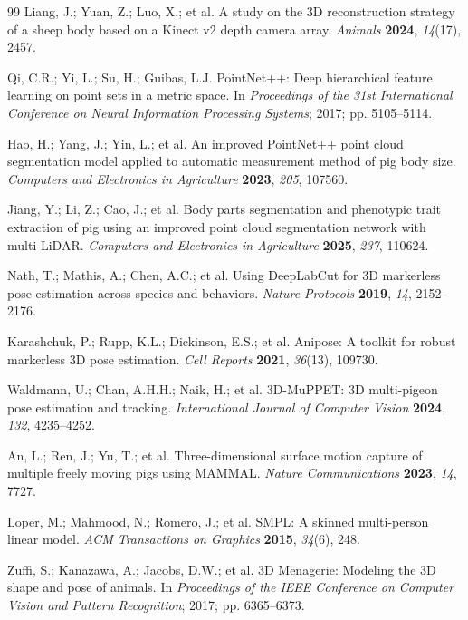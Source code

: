 \documentclass[computers,article,submit,pdftex,moreauthors]{mdpi}
\begin{document}
\begin{thebibliography}{99}
 Liang, J.; Yuan, Z.; Luo, X.; et al. A study on the 3D reconstruction strategy of a sheep body based on a Kinect v2 depth camera array. \textit{Animals} \textbf{2024}, \textit{14}(17), 2457.

 Qi, C.R.; Yi, L.; Su, H.; Guibas, L.J. PointNet++: Deep hierarchical feature learning on point sets in a metric space. In \textit{Proceedings of the 31st International Conference on Neural Information Processing Systems}; 2017; pp. 5105--5114.

 Hao, H.; Yang, J.; Yin, L.; et al. An improved PointNet++ point cloud segmentation model applied to automatic measurement method of pig body size. \textit{Computers and Electronics in Agriculture} \textbf{2023}, \textit{205}, 107560.

 Jiang, Y.; Li, Z.; Cao, J.; et al. Body parts segmentation and phenotypic trait extraction of pig using an improved point cloud segmentation network with multi-LiDAR. \textit{Computers and Electronics in Agriculture} \textbf{2025}, \textit{237}, 110624.

 Nath, T.; Mathis, A.; Chen, A.C.; et al. Using DeepLabCut for 3D markerless pose estimation across species and behaviors. \textit{Nature Protocols} \textbf{2019}, \textit{14}, 2152--2176.

 Karashchuk, P.; Rupp, K.L.; Dickinson, E.S.; et al. Anipose: A toolkit for robust markerless 3D pose estimation. \textit{Cell Reports} \textbf{2021}, \textit{36}(13), 109730.

 Waldmann, U.; Chan, A.H.H.; Naik, H.; et al. 3D-MuPPET: 3D multi-pigeon pose estimation and tracking. \textit{International Journal of Computer Vision} \textbf{2024}, \textit{132}, 4235--4252.

 An, L.; Ren, J.; Yu, T.; et al. Three-dimensional surface motion capture of multiple freely moving pigs using MAMMAL. \textit{Nature Communications} \textbf{2023}, \textit{14}, 7727.

 Loper, M.; Mahmood, N.; Romero, J.; et al. SMPL: A skinned multi-person linear model. \textit{ACM Transactions on Graphics} \textbf{2015}, \textit{34}(6), 248.

 Zuffi, S.; Kanazawa, A.; Jacobs, D.W.; et al. 3D Menagerie: Modeling the 3D shape and pose of animals. In \textit{Proceedings of the IEEE Conference on Computer Vision and Pattern Recognition}; 2017; pp. 6365--6373.


\end{thebibliography}
\end{document}

